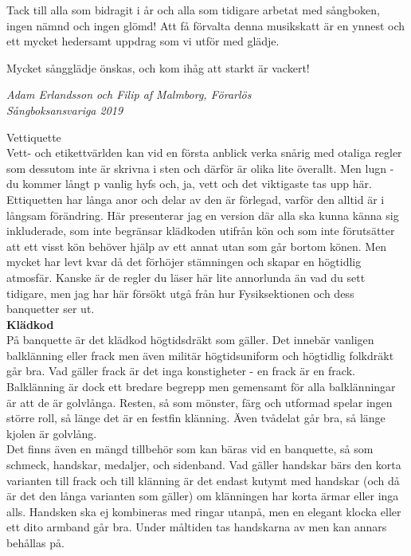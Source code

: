 \documentclass[a6paper,12pt]{article}
\begin{document}
Tack till alla som bidragit i år och alla som tidigare arbetat med sångboken, ingen nämnd och ingen glömd! Att få förvalta denna musikskatt är en ynnest och ett mycket hedersamt uppdrag som vi utför med glädje.

Mycket sångglädje önskas, och kom ihåg att starkt är vackert! 
\begin{flushright}
\textit{Adam Erlandsson och Filip af Malmborg, Förarlös\\ Sångboksansvariga 2019}
\end{flushright}


\newpage



\newpage
\setlength{\oddsidemargin}{-0.57in}
\noindent
\Large Vettiquette\\
\footnotesize Vett- och etikettvärlden kan vid en första anblick verka snårig med otaliga regler som dessutom inte är skrivna i sten och därför är olika lite överallt. Men lugn - du kommer långt p vanlig hyfs och, ja, vett och det viktigaste tas upp här. Ettiquetten har långa anor och delar av den är förlegad, varför den alltid är i långsam förändring. Här presenterar jag en version där alla ska kunna känna sig inkluderade, som inte begränsar klädkoden utifrån kön och som inte förutsätter att ett visst kön behöver hjälp av ett annat utan som går bortom könen. Men mycket har levt kvar då det förhöjer stämningen och skapar en högtidlig atmosfär. Kanske är de regler du läser här lite annorlunda än vad du sett tidigare, men jag har här försökt utgå från hur Fysiksektionen och dess banquetter ser ut.\\
\normalsize\textbf{Klädkod}\\
\footnotesize På banquette är det klädkod högtidsdräkt som gäller. Det innebär vanligen balklänning eller frack men även militär högtidsuniform och högtidlig folkdräkt går bra. Vad gäller frack är det inga konstigheter - en frack är en frack. Balklänning är dock ett bredare begrepp men gemensamt för alla balklänningar är att de är golvlånga. Resten, så som mönster, färg och utformad spelar ingen större roll, så länge det är en festfin klänning. Även tvådelat går bra, så länge kjolen är golvlång.\\
Det finns även en mängd tillbehör som kan bäras vid en banquette, så som schmeck, handskar, medaljer, och sidenband. Vad gäller handskar bärs den korta 
\newpage
\setlength{\oddsidemargin}{-0.37in}
\noindent
varianten till frack och till klänning är det endast kutymt med handskar (och då är det den långa varianten som gäller) om klänningen har korta ärmar eller inga alls. Handsken ska ej kombineras med ringar utanpå, men en elegant klocka eller ett dito armband går bra. Under måltiden tas handskarna av men kan annars behållas på.\\
\end{document}
